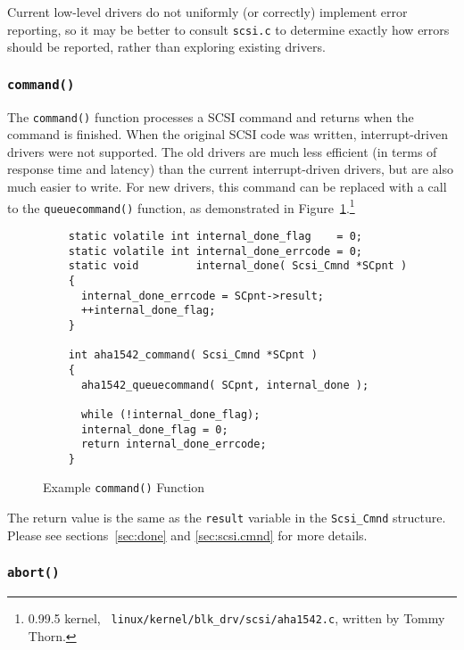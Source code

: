 Current low-level drivers do not uniformly (or correctly) implement error
reporting, so it may be better to consult {\tt scsi.c} to determine exactly
how errors should be reported, rather than exploring existing drivers.



\subsubsection{{\tt command()}}

The \verb|command()| function processes a SCSI command and returns when the
command is finished.  When the original SCSI code was written,
interrupt-driven drivers were not supported.  The old drivers are much less
efficient (in terms of response time and latency) than the current
interrupt-driven drivers, but are also much easier to write.  For new
drivers, this command can be replaced with a call to the
\verb|queuecommand()| function, as demonstrated in
Figure~\ref{fig:command}.\footnote{\Linux{} 0.99.5 kernel, {\tt
    linux/kernel/blk\_drv/scsi/aha1542.c}, written by Tommy Thorn.}

\begin{figure}[hbtp]
  \leavevmode
  \begin{center}
    \begin{verbatim}
    static volatile int internal_done_flag    = 0;
    static volatile int internal_done_errcode = 0;
    static void         internal_done( Scsi_Cmnd *SCpnt )
    {
      internal_done_errcode = SCpnt->result;
      ++internal_done_flag;
    }

    int aha1542_command( Scsi_Cmnd *SCpnt )
    {
      aha1542_queuecommand( SCpnt, internal_done );

      while (!internal_done_flag);
      internal_done_flag = 0;
      return internal_done_errcode;
    }
    \end{verbatim}
    \caption{Example {\tt command()} Function}
    \label{fig:command}
  \end{center}
\end{figure}

The return value is the same as the \verb|result| variable in the
\verb|Scsi_Cmnd| structure.  Please see sections~\ref{sec:done} and
\ref{sec:scsi.cmnd} for more details.


\subsubsection{{\tt abort()}}
\label{sec:abort}

